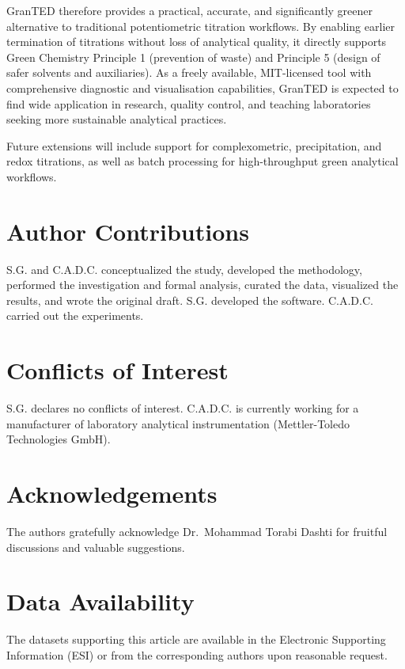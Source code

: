 \documentclass[twoside,twocolumn,9pt]{article}
\begin{document}
\textsf{GranTED} therefore provides a practical, accurate, and significantly greener alternative to traditional potentiometric titration workflows. By enabling earlier termination of titrations without loss of analytical quality, it directly supports Green Chemistry Principle 1 (prevention of waste) and Principle 5 (design of safer solvents and auxiliaries). As a freely available, MIT-licensed tool with comprehensive diagnostic and visualisation capabilities, GranTED is expected to find wide application in research, quality control, and teaching laboratories seeking more sustainable analytical practices.

Future extensions will include support for complexometric, precipitation, and redox titrations, as well as batch processing for high-throughput green analytical workflows.

\section*{Author Contributions}

S.G. and C.A.D.C. conceptualized the study, developed the methodology, performed the investigation and formal analysis, curated the data, visualized the results, and wrote the original draft. S.G. developed the software. C.A.D.C. carried out the experiments.

\section*{Conflicts of Interest}

S.G. declares no conflicts of interest. C.A.D.C. is currently working for a manufacturer of laboratory analytical instrumentation (Mettler-Toledo Technologies GmbH).

\section*{Acknowledgements}

The authors gratefully acknowledge Dr.~Mohammad Torabi Dashti for fruitful discussions and valuable suggestions.

\section*{Data Availability}

The datasets supporting this article are available in the Electronic Supporting Information (ESI) or from the corresponding authors upon reasonable request.



\end{document}
